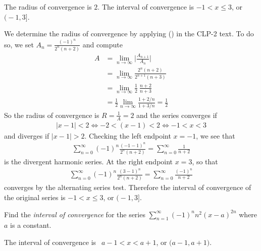 \begin{answer}
The radius of convergence is $2$.
The interval of convergence  is $-1< x\le3$,
or $\big(-1,3\big]$.
\end{answer}

\begin{solution}
We determine the radius of convergence by applying () in the CLP-2 text. 
To do so, we set $A_n= \frac{(-1)^n}{2^n(n+2)}$ and compute
\begin{align*}
A &= \lim_{n\to\infty} \bigg| \frac{A_{n+1}}{A_n}\bigg| \\
&= \lim_{n\to\infty}  \frac{2^n(n+2)}{2^{n+1}(n+3)}  \\
&= \lim_{n\to\infty} \frac{1}{2}\ \frac{n+2}{n+3} \\
&= \frac{1}{2} \lim_{n\to\infty} \frac{1+2/n}{1+3/n} = \frac{1}{2}
\end{align*}
So the radius of convergence is $R=\frac{1}{A}=2$ and
the series converges if
\begin{align*}
|x-1|<2
\iff -2<(x-1)<2
\iff -1<x<3
\end{align*}
and diverges if $|x-1|>2$. 
Checking the left endpoint $x=-1$, we see that
\begin{align*}
\sum_{n=0}^\infty (-1)^n\frac{(-1-1)^n}{2^n(n+2)}
= \sum_{n=0}^\infty \frac{1}{n+2}
\end{align*}
is the divergent harmonic series. At the right endpoint $x=3$,
so that 
\begin{align*}
\sum_{n=0}^\infty (-1)^n\frac{(3-1)^n}{2^n(n+2)}
= \sum_{n=0}^\infty \frac{(-1)^n}{n+2}
\end{align*}
converges by the alternating series test. Therefore the interval of convergence of the
original series is $-1< x\le 3$, or $\big(-1,3\big]$.

\end{solution}


\begin{question}[2014D]
Find the \emph{interval of convergence} for the series
$\displaystyle \sum_{n=1}^\infty (-1)^n n^2(x-a)^{2n}$
where $a$ is a constant.
\end{question}


\begin{answer}
The interval of convergence  is $\ \ a-1< x<a+1$,
or $\big(a-1,a+1\big)$.
\end{answer}

